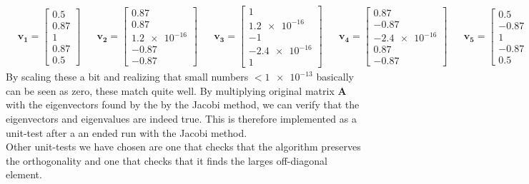 \documentclass[american,a4paper,12pt]{article}
\renewcommand{\vec}[1]{\mathbf{#1}} %
\begin{document}
\begin{align*}
     &\vec{v_1} = \begin{bmatrix} 0.5 \\ 0.87 \\ 1 \\ 0.87 \\ 0.5                                \end{bmatrix}&
    &\vec{v_2} = \begin{bmatrix} 0.87 \\ 0.87 \\ \num{1.2e-16} \\ -0.87 \\ -0.87                \end{bmatrix}&
    &\vec{v_3} = \begin{bmatrix} 1 \\ \num{1.2e-16} \\ -1 \\ \num{-2.4e-16} \\ 1                \end{bmatrix}&
    &\vec{v_4} = \begin{bmatrix} 0.87 \\ -0.87 \\ \num{-2.4e-16} \\ 0.87 \\ -0.87               \end{bmatrix}&
    &\vec{v_5} = \begin{bmatrix} 0.5 \\ -0.87 \\ 1 \\ -0.87 \\ 0.5                              \end{bmatrix}&
\end{align*}
By scaling these a bit and realizing that small numbers $< \num{1e-13}$ basically can be seen as zero, these match quite well. By multiplying original matrix $\vec{A}$ with the eigenvectors found by the by the Jacobi method, we can verify that the eigenvectors and eigenvalues are indeed true. This is therefore implemented as a unit-test after a an ended run with the Jacobi method.\\
Other unit-tests we have chosen are one that checks that the algorithm preserves the orthogonality and one that checks that it finds the larges off-diagonal element.
\end{document}
